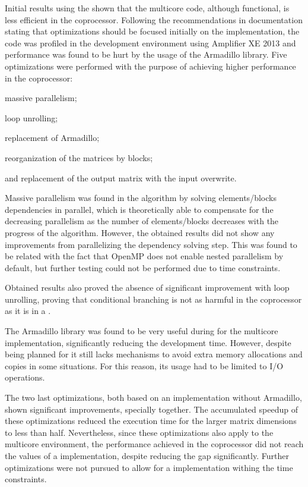 \documentclass[../thesis]{subfiles}
\begin{document}
	Initial results using the \intel\xeonphi shown that the multicore code, although functional, is less efficient in the coprocessor. Following the recommendations in \intel documentation stating that optimizations should be focused initially on the \cpu implementation, the code was profiled in the development environment using \intel\vtune Amplifier XE 2013 and performance was found to be hurt by the usage of the Armadillo library. Five optimizations were performed with the purpose of achieving higher performance in the \intel\xeonphi coprocessor:
	\begin{inparaenum}[(a)]
		\item massive parallelism;
		\item loop unrolling;
		\item replacement of Armadillo;
		\item reorganization of the matrices by blocks;
		\item and replacement of the output matrix with the input overwrite.
	\end{inparaenum}

	Massive parallelism was found in the algorithm by solving elements/blocks dependencies in parallel, which is theoretically able to compensate for the decreasing parallelism as the number of elements/blocks decreases with the progress of the algorithm. However, the obtained results did not show any improvements from parallelizing the dependency solving step. This was found to be related with the fact that OpenMP does not enable nested parallelism by default, but further testing could not be performed due to time constraints.

	Obtained results also proved the absence of significant improvement with loop unrolling, proving that conditional branching is not as harmful in the coprocessor as it is in a \gpu.

	The Armadillo library was found to be very useful during for the multicore implementation, significantly reducing the development time. However, despite being planned for \hpc it still lacks mechanisms to avoid extra memory allocations and copies in some situations. For this reason, its usage had to be limited to I/O operations.

	The two last optimizations, both based on an implementation without Armadillo, shown significant improvements, specially together. The accumulated speedup of these optimizations reduced the execution time for the larger matrix dimensions to less than half. Nevertheless, since these optimizations also apply to the multicore environment, the performance achieved in the coprocessor did not reach the values of a \cpu implementation, despite reducing the gap significantly. Further optimizations were not pursued to allow for a \cuda implementation withing the time constraints.
\end{document}
